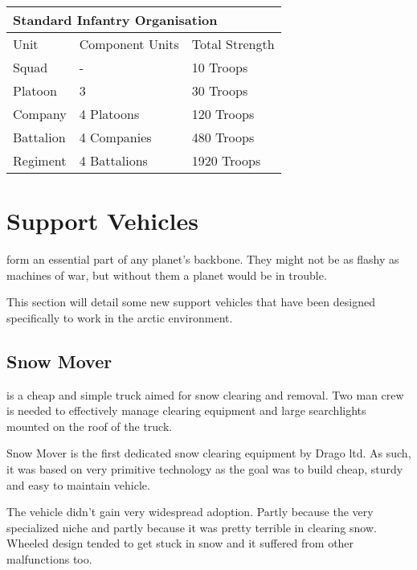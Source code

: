 \documentclass{tufte-book}
\begin{document}
\bigskip
\begin{minipage}{\textwidth}
\begin{center}
\begin{tabular}{lll}
\toprule
\multicolumn{3}{l}{Standard Infantry Organisation} \\
\midrule
Unit & Component Units & Total Strength \\
\midrule
Squad     & -            & 10 Troops \\
Platoon   & 3            & 30 Troops \\
Company   & 4 Platoons   & 120 Troops \\
Battalion & 4 Companies  & 480 Troops \\
Regiment  & 4 Battalions & 1920 Troops \\
\bottomrule
\end{tabular}
\end{center}
\end{minipage}

\chapter{Support Vehicles}
\label{ch:support-vehicles}


 form an essential part of any planet's
backbone. They might not be as flashy as machines of war, but without
them a planet would be in trouble.

This section will detail some new support vehicles that have been
designed specifically to work in the arctic environment.



\section{Snow Mover}
 is a cheap and simple truck aimed for snow clearing and
removal. Two man crew is needed to effectively manage clearing equipment
and large searchlights mounted on the roof of the truck.

Snow Mover is the first dedicated snow clearing equipment by Drago ltd. As
such, it was based on very primitive technology as the goal was to build
cheap, sturdy and easy to maintain vehicle.

The vehicle didn't gain very widespread adoption. Partly because the very
specialized niche and partly because it was pretty terrible in clearing
snow. Wheeled design tended to get stuck in snow and it suffered from
other malfunctions too.
\end{document}
